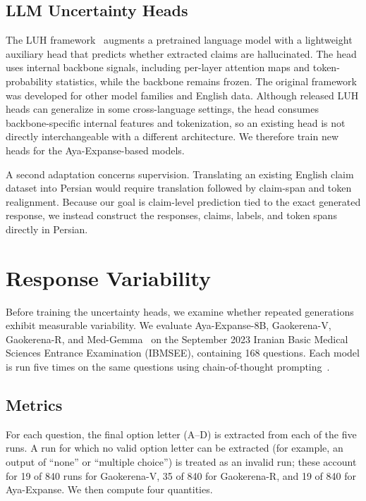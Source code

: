 \documentclass[conference]{IEEEtran}
\begin{document}
\subsection{LLM Uncertainty Heads}

The LUH framework~\cite{b1} augments a pretrained language model with a lightweight auxiliary head that predicts whether extracted claims are hallucinated. The head uses internal backbone signals, including per-layer attention maps and token-probability statistics, while the backbone remains frozen. The original framework was developed for other model families and English data. Although released LUH heads can generalize in some cross-language settings, the head consumes backbone-specific internal features and tokenization, so an existing head is not directly interchangeable with a different architecture. We therefore train new heads for the Aya-Expanse-based models.

A second adaptation concerns supervision. Translating an existing English claim dataset into Persian would require translation followed by claim-span and token realignment. Because our goal is claim-level prediction tied to the exact generated response, we instead construct the responses, claims, labels, and token spans directly in Persian.

\section{Response Variability}

Before training the uncertainty heads, we examine whether repeated generations exhibit measurable variability. We evaluate Aya-Expanse-8B, Gaokerena-V, Gaokerena-R, and Med-Gemma~\cite{b11} on the September 2023 Iranian Basic Medical Sciences Entrance Examination (IBMSEE), containing 168 questions. Each model is run five times on the same questions using chain-of-thought prompting~\cite{b12}.

\subsection{Metrics}

For each question, the final option letter (A--D) is extracted from each of the five runs. A run for which no valid option letter can be extracted (for example, an output of ``none'' or ``multiple choice'') is treated as an invalid run; these account for 19 of 840 runs for Gaokerena-V, 35 of 840 for Gaokerena-R, and 19 of 840 for Aya-Expanse. We then compute four quantities.
\end{document}
